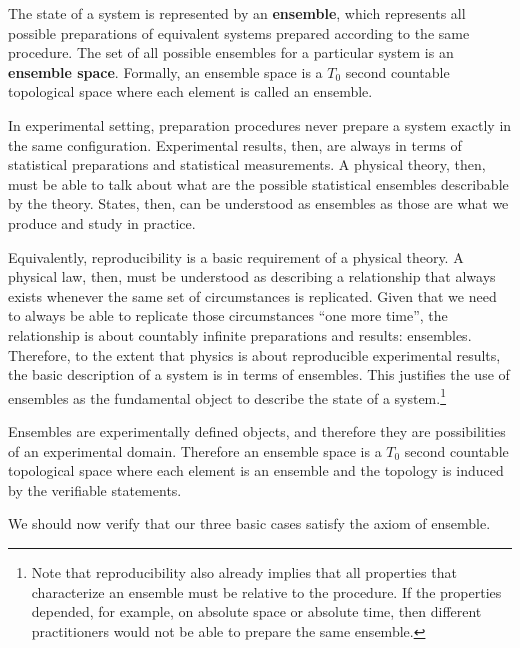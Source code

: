 \begin{mathSection}
	\begin{axiom} 
		The state of a system is represented by an \textbf{ensemble}, which represents all possible preparations of equivalent systems prepared according to the same procedure. The set of all possible ensembles for a particular system is an \textbf{ensemble space}. Formally, an ensemble space is a $T_0$ second countable topological space where each element is called an ensemble.
	\end{axiom}
	
	\begin{justification}
		In experimental setting, preparation procedures never prepare a system exactly in the same configuration. Experimental results, then, are always in terms of statistical preparations and statistical measurements. A physical theory, then, must be able to talk about what are the possible statistical ensembles describable by the theory. States, then, can be understood as ensembles as those are what we produce and study in practice.
		
		Equivalently, reproducibility is a basic requirement of a physical theory. A physical law, then, must be understood as describing a relationship that always exists whenever the same set of circumstances is replicated. Given that we need to always be able to replicate those circumstances ``one more time'', the relationship is about countably infinite preparations and results: ensembles. Therefore, to the extent that physics is about reproducible experimental results, the basic description of a system is in terms of ensembles. This justifies the use of ensembles as the fundamental object to describe the state of a system.\footnote{Note that reproducibility also already implies that all properties that characterize an ensemble must be relative to the procedure. If the properties depended, for example, on absolute space or absolute time, then different practitioners would not be able to prepare the same ensemble.}
		
		Ensembles are experimentally defined objects, and therefore they are possibilities of an experimental domain. Therefore an ensemble space is a $T_0$ second countable topological space where each element is an ensemble and the topology is induced by the verifiable statements.
	\end{justification}
\end{mathSection}

We should now verify that our three basic cases satisfy the axiom of ensemble.

